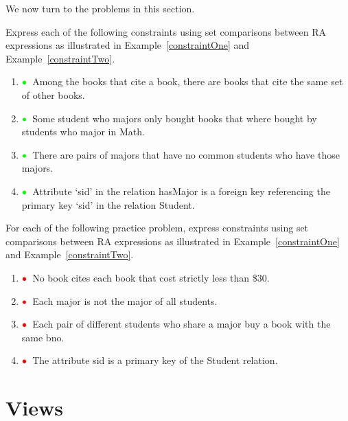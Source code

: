 \documentclass[11pt]{article}
\newcommand{\red}[1]{{\color{red}#1}}
\newcommand{\green}[1]{{\color{green}#1}}
\newcommand{\redbullet}{$\red{\bullet}$}
\newcommand{\greenbullet}{$\green{\bullet}$}
\begin{document}
\bigskip
We now turn to the problems in this section.

Express each of the following constraints using set comparisons between RA expressions as illustrated in Example~\ref{constraintOne} and
Example~\ref{constraintTwo}.

\begin{enumerate}[resume]
\item \greenbullet\  Among the books that cite a book, there are books that cite the same set of other books.






\item \greenbullet\  Some student who majors only bought books that where bought by students who major in Math.



\item \greenbullet\  There are pairs of majors that have no common students who have those majors.





\item \greenbullet\  Attribute `sid' in the relation hasMajor is a foreign key referencing the primary key `sid' in the relation Student.


\end{enumerate}

For each of the following practice problem, express constraints using set comparisons between RA expressions as illustrated in Example~\ref{constraintOne} and Example~\ref{constraintTwo}.



\begin{enumerate}[resume]
\item \redbullet\ No book cites each book that cost strictly 
less than \$30.

\item \redbullet\  Each major is not the major of all students.


\item \redbullet\  Each pair of different students who share a major buy a book with the same bno.

\item \redbullet\  The attribute sid is a primary key of the Student relation.


\end{enumerate}



\section{Views}
\end{document}
